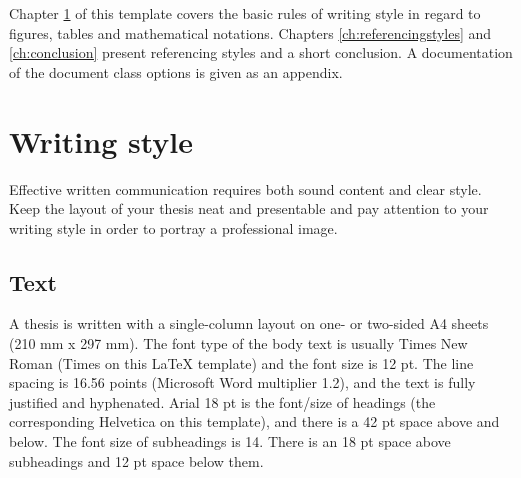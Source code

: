 \documentclass[twoside,draftfooter]{tutthesis} %
\begin{document}
Chapter \ref{ch:writingstyle} of this template covers the basic rules of writing style in regard to figures, tables and mathematical notations.
Chapters \ref{ch:referencingstyles} and \ref{ch:conclusion} present referencing styles and a short conclusion.
A documentation of the document class options is given as an appendix.



\chapter{Writing style}
\label{ch:writingstyle}

Effective written communication requires both sound content and clear style.
Keep the layout of your thesis neat and presentable and pay attention to your writing style in order to portray a professional image. 

\section{Text}

A thesis is written with a single-column layout on one- or two-sided A4 sheets (210 mm x 297 mm).
The font type of the body text is usually Times New Roman (Times on this LaTeX template) and the font size is 12 pt.
The line spacing is 16.56 points (Microsoft Word multiplier 1.2), and the text is fully justified and hyphenated.
Arial 18 pt is the font/size of headings (the corresponding Helvetica on this template), and there is a 42 pt space above and below.
The font size of subheadings is 14.
There is an 18 pt space above subheadings and 12 pt space below them.
\end{document}
